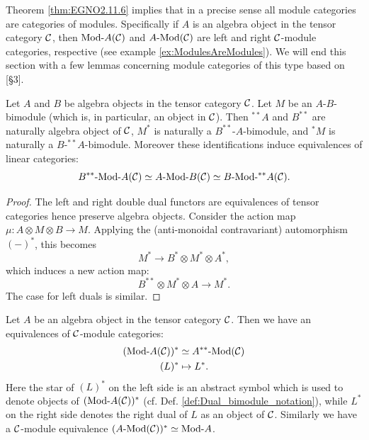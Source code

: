 \documentclass{amsart}
\begin{document}
Theorem \ref{thm:EGNO2.11.6} implies that in a precise sense all module categories are categories of modules. Specifically if $A$ is an algebra object in the tensor category $\mathcal C$, then $\Mod{}{A}(\cC)$ and $\Mod{A}{}(\cC)$ are left and right $\mathcal C$-module categories, respective (see example \ref{ex:ModulesAreModules}). We will end this section with a few lemmas concerning module categories of this type based on \cite{0404504}[\S 3].

\begin{lemma}
	Let $A$ and $B$ be algebra objects in the tensor category $\mathcal C$. Let $M$ be an $A$-$B$-bimodule (which is, in particular, an object in $\mathcal C$). Then ${}^{**}A$ and $B^{**}$ are naturally algebra object of $\mathcal C$, $M^*$ is naturally a $B^{**}$-$A$-bimodule, and ${}^*M$ is naturally a $B$-${}^{**}A$-bimodule. Moreover these identifications induce equivalences of linear categories:
	\begin{equation*}
		\Mod{B^{**}}{A}(\cC) \simeq \Mod{A}{B}(\cC) \simeq \Mod{B}{{}^{**}A}(\cC).
	\end{equation*}
\end{lemma}

\begin{proof}
	The left and right double dual functors are equivalences of tensor categories hence preserve algebra objects. Consider the action map $\mu:A \otimes M \otimes B \to M$. Applying the (anti-monoidal contravariant) automorphism $(-)^*$, this becomes
	\begin{equation*}
		M^* \to B^* \otimes M^* \otimes A^*,
	\end{equation*}
	which induces a new action map:
	\begin{equation*}
		B^{**} \otimes M^* \otimes A \to M^*.
	\end{equation*}
	The case for left duals is similar. 
\end{proof}

\begin{lemma}
	Let $A$ be an algebra object in the tensor category $\mathcal C$. Then we have an equivalences of $\mathcal C$-module categories: 
	\begin{align*}
		(\Mod{}{A}(\cC))^* & \simeq \Mod{A^{**}}{}(\cC) \\
		(L)^* & \mapsto L^*.
	\end{align*}
	Here the star of $(L)^*$ on the left side is an abstract symbol which is used to denote objects of $(\Mod{}{A}(\cC))^*$ (cf. Def. \ref{def:Dual_bimodule_notation}), while $L^*$ on the right side denotes the right dual of $L$ as an object of $\mathcal C$. Similarly we have a $\mathcal C$-module equivalence $(\Mod{A}{}(\cC))^* \simeq \Mod{}{A}$.	
\end{lemma}
\end{document}
